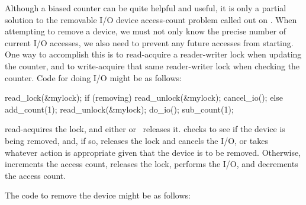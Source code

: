 \QuickQuizEnd

Although a biased counter can be quite helpful and useful, it is only a
partial solution to the removable I/O device access-count problem
called out on
.
When attempting to remove a device, we must not only know the precise
number of current I/O accesses, we also need to prevent any future
accesses from starting.
One way to accomplish this is to read-acquire a reader-writer lock
when updating the counter, and to write-acquire that same reader-writer
lock when checking the counter.
Code for doing I/O might be as follows:

\begin{fcvlabel}
\begin{VerbatimN}[commandchars=\\\[\]]
read_lock(&mylock);		\lnlbl[acq]
if (removing) {			\lnlbl[check]
	read_unlock(&mylock);	\lnlbl[rel1]
	cancel_io();		\lnlbl[cancel]
} else {
	add_count(1);		\lnlbl[inc]
	read_unlock(&mylock);	\lnlbl[rel2]
	do_io();		\lnlbl[do]
	sub_count(1);		\lnlbl[dec]
}
\end{VerbatimN}
\end{fcvlabel}

\begin{fcvref}
 read-acquires the lock, and either
 or~ releases it.
 checks to see if the device is being removed, and, if so,
 releases the lock and
 cancels the I/O, or takes whatever
action is appropriate given that the device is to be removed.
Otherwise,  increments the access count,
 releases the
lock,  performs the I/O, and
 decrements the access count.
\end{fcvref}

\QuickQuizEnd

The code to remove the device might be as follows:

